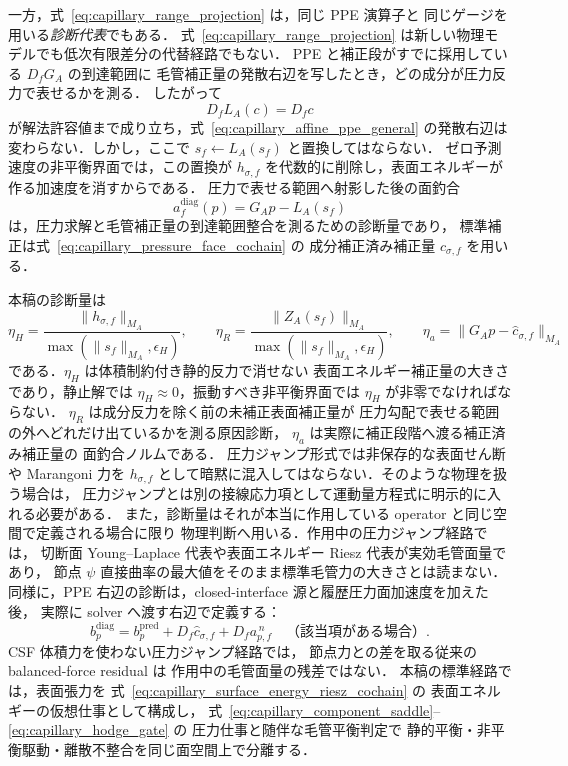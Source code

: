 一方，式~\eqref{eq:capillary_range_projection} は，同じ PPE 演算子と
同じゲージを用いる\emph{診断代表}でもある．
式~\eqref{eq:capillary_range_projection} は新しい物理モデルでも低次有限差分の代替経路でもない．
PPE と補正段がすでに採用している $D_fG_A$ の到達範囲に
毛管補正量の発散右辺を写したとき，どの成分が圧力反力で表せるかを測る．
したがって
\begin{equation}
  D_fL_A(c) = D_fc
  \label{eq:capillary_range_projection_same_rhs}
\end{equation}
が解法許容値まで成り立ち，式~\eqref{eq:capillary_affine_ppe_general}
の発散右辺は変わらない．しかし，ここで
$s_f\leftarrow L_A(s_f)$ と置換してはならない．
ゼロ予測速度の非平衡界面では，この置換が
$h_{\sigma,f}$ を代数的に削除し，表面エネルギーが作る加速度を消すからである．
圧力で表せる範囲へ射影した後の面釣合
\begin{equation}
  a_f^{\mathrm{diag}}(p)
  =
  G_Ap-L_A(s_f)
  \label{eq:range_projected_capillary_face_balance}
\end{equation}
は，圧力求解と毛管補正量の到達範囲整合を測るための診断量であり，
標準補正は式~\eqref{eq:capillary_pressure_face_cochain} の
成分補正済み補正量 $\widehat c_{\sigma,f}$ を用いる．

本稿の診断量は
\begin{equation}
  \eta_H
  =
  \frac{\|h_{\sigma,f}\|_{M_A}}
       {\max(\|s_f\|_{M_A},\epsilon_H)},\qquad
  \eta_R
  =
  \frac{\|Z_A(s_f)\|_{M_A}}
       {\max(\|s_f\|_{M_A},\epsilon_H)},\qquad
  \eta_a
  =
  \|G_Ap-\widehat c_{\sigma,f}\|_{M_A}
  \label{eq:capillary_hodge_gate}
\end{equation}
である．$\eta_H$ は体積制約付き静的反力で消せない
表面エネルギー補正量の大きさであり，静止解では
$\eta_H\approx0$，振動すべき非平衡界面では $\eta_H$ が非零でなければならない．
$\eta_R$ は成分反力を除く前の未補正表面補正量が
圧力勾配で表せる範囲の外へどれだけ出ているかを測る原因診断，
$\eta_a$ は実際に補正段階へ渡る補正済み補正量の
面釣合ノルムである．
圧力ジャンプ形式では非保存的な表面せん断や Marangoni 力を
$h_{\sigma,f}$ として暗黙に混入してはならない．そのような物理を扱う場合は，
圧力ジャンプとは別の接線応力項として運動量方程式に明示的に入れる必要がある．
また，診断量はそれが本当に作用している operator と同じ空間で定義される場合に限り
物理判断へ用いる．作用中の圧力ジャンプ経路では，
切断面 Young--Laplace 代表や表面エネルギー Riesz 代表が実効毛管面量であり，
節点 $\psi$ 直接曲率の最大値をそのまま標準毛管力の大きさとは読まない．
同様に，PPE 右辺の診断は，closed-interface 源と履歴圧力面加速度を加えた後，
実際に solver へ渡す右辺で定義する：
\begin{equation}
  b_p^{\mathrm{diag}}
  =
  b_p^{\mathrm{pred}}
  +D_f\widehat c_{\sigma,f}
  +D_f a_{p,f}^{\,n}
  \quad\text{（該当項がある場合）}.
  \label{eq:diagnostic_contract_active_route}
\end{equation}
CSF 体積力を使わない圧力ジャンプ経路では，
節点力との差を取る従来の balanced-force residual は
作用中の毛管面量の残差ではない．
本稿の標準経路では，表面張力を
式~\eqref{eq:capillary_surface_energy_riesz_cochain} の
表面エネルギーの仮想仕事として構成し，
式~\eqref{eq:capillary_component_saddle}--\eqref{eq:capillary_hodge_gate} の
圧力仕事と随伴な毛管平衡判定で
静的平衡・非平衡駆動・離散不整合を同じ面空間上で分離する．

